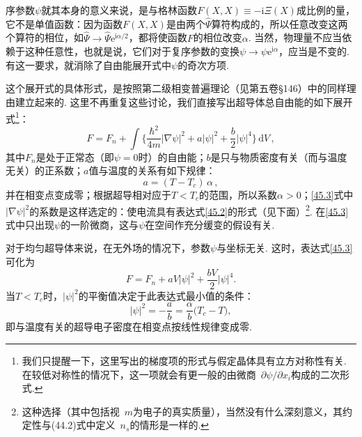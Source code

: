 序参数$\psi$就其本身的意义来说，是与格林函数$F(X,X)\equiv-\mathrm i\Xi(X)$成比例的量，它不是单值函数：因为函数$F(X,X)$是由两个$\hat\Psi$算符构成的，所以任意改变这两个算符的相位，如$\hat\Psi\to\hat\Psi\mathrm e^{\mathrm i\alpha/2}$，都将使函数$F$的相位改变$\alpha$. 当然，物理量不应当依赖于这种任意性，也就是说，它们对于复序参数的变换$\psi\to\psi\mathrm e^{\mathrm i\alpha}$，应当是不变的. 有这一要求，就消除了自由能展开式中$\psi$的奇次方项.

这个展开式的具体形式，是按照第二级相变普遍理论（见第五卷§146）中的同样理由建立起来的. 这里不再重复这些讨论，我们直接写出超导体总自由能的如下展开式\footnote{我们只提醒一下，这里写出的梯度项的形式与假定晶体具有立方对称性有关. 在较低对称性的情况下，这一项就会有更一般的由微商~$\partial\psi/\partial x_i$构成的二次形式.}：
\begin{equation}
F = F_n + \int\Biggl\{\frac{\hbar^2}{4m}|\nabla\psi|^2 + a|\psi|^2 + \frac{b}{2}|\psi|^4\Biggr\}\,\mathrm dV\,,
\label{45.3}
\end{equation}
其中$F_n$是处于正常态（即$\psi=0$时）的自由能；$b$是只与物质密度有关（而与温度无关）的正系数；$a$值与温度的关系有如下规律：
\begin{equation}
a = (T-T_c)\,\alpha\,,
\label{45.4}
\end{equation}
并在相变点变成零；根据超导相对应于$T<T_c$的范围，所以系数$\alpha>0$；\eqref{45.3}式中$|\nabla\psi|^2$的系数是这样选定的：使电流具有表达式\eqref{45.2}的形式（见下面）\footnote{这种选择（其中包括视~$m$为电子的真实质量），当然没有什么深刻意义，其约定性与(44.2)式中定义~$n_s$的情形是一样的.}. 在\eqref{45.3}式中只出现$\psi$的一阶微商，这与$\psi$在空间作充分缓变的假设有关.

对于均匀超导体来说，在无外场的情况下，参数$\psi$与坐标无关. 这时，表达式\eqref{45.3}可化为
\begin{equation}
F = F_n + aV|\psi|^2 + \frac{bV}{2}|\psi|^4.
\label{45.5}
\end{equation}
当$T<T_c$时，$|\psi|^2$的平衡值决定于此表达式最小值的条件：
\begin{equation}
|\psi|^2 = -\frac{a}{b} = \frac{\alpha}{b}\bigl(T_c-T\bigr),
\label{45.6}
\end{equation}
即与温度有关的超导电子密度在相变点按线性规律变成零.

